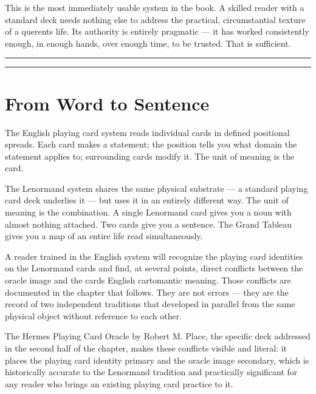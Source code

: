 This is the most immediately usable system in the book. A skilled reader with a standard deck needs nothing else to address the practical, circumstantial texture of a querent\textquotesingle s life. Its authority is entirely pragmatic --- it has worked consistently enough, in enough hands, over enough time, to be trusted. That is sufficient.

\begin{center}\rule{0.5\linewidth}{0.5pt}\end{center}

\begin{center}\rule{0.5\linewidth}{0.5pt}\end{center}

\section{From Word to Sentence}\label{between-chapters-three-and-four}

The English playing card system reads individual cards in defined positional spreads. Each card makes a statement; the position tells you what domain the statement applies to; surrounding cards modify it. The unit of meaning is the card.

The Lenormand system shares the same physical substrate --- a standard playing card deck underlies it --- but uses it in an entirely different way. The unit of meaning is the combination. A single Lenormand card gives you a noun with almost nothing attached. Two cards give you a sentence. The Grand Tableau gives you a map of an entire life read simultaneously.

A reader trained in the English system will recognize the playing card identities on the Lenormand cards and find, at several points, direct conflicts between the oracle image and the card\textquotesingle s English cartomantic meaning. Those conflicts are documented in the chapter that follows. They are not errors --- they are the record of two independent traditions that developed in parallel from the same physical object without reference to each other.

The Hermes Playing Card Oracle by Robert M. Place, the specific deck addressed in the second half of the chapter, makes these conflicts visible and literal: it places the playing card identity primary and the oracle image secondary, which is historically accurate to the Lenormand tradition and practically significant for any reader who brings an existing playing card practice to it.

